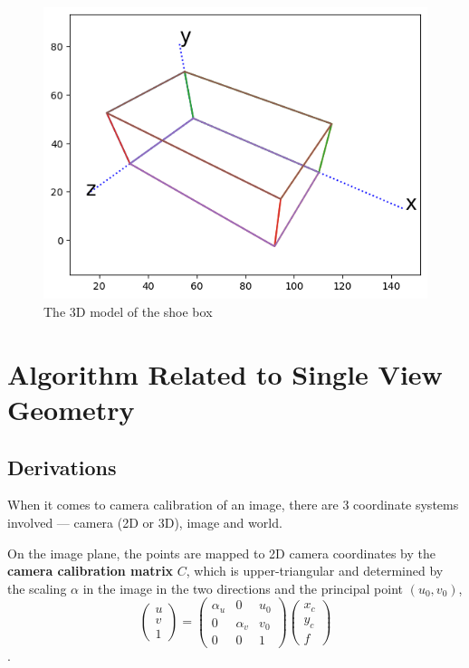 \documentclass[12pt, a4paper]{article}
\begin{document}
\begin{figure}[htbp]
\centering
\includegraphics[width=\linewidth]{shoe_box_model}
\caption{The 3D model of the shoe box}
\label{fig:box_model}
\end{figure}

\section{Algorithm Related to Single View Geometry}

\subsection{Derivations}

When it comes to camera calibration of an image, there are 3 coordinate systems involved --- camera (2D or 3D), image and world.

On the image plane, the points are mapped to 2D camera coordinates by the \textbf{camera calibration matrix} $C$, which is upper-triangular and determined by the scaling $\alpha$ in the image in the two directions and the principal point $(u_0,v_0)$, $$\begin{pmatrix}u\\v\\1\end{pmatrix}=\begin{pmatrix}\alpha_u&0&u_0\\0&\alpha_v&v_0\\0&0&1\end{pmatrix}\begin{pmatrix}x_c\\y_c\\f\end{pmatrix}$$.
\end{document}
